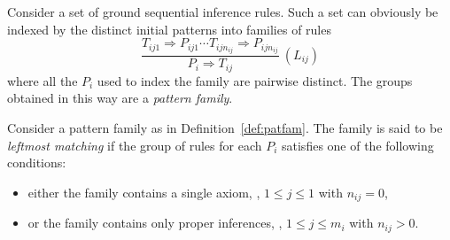 \documentclass[letterpaper,11pt]{article}
\begin{document}
\begin{definition}\label{def:patfam}
  Consider a set of ground sequential inference rules.  Such a set can obviously be indexed by the
  distinct initial patterns into families of rules
  \begin{displaymath}
    \dfrac{ T_{ij1} ⇒ P_{ij1} \cdots T_{ijn_{ij}} ⇒ P_{ijn_{ij}} }{ P_i ⇒ T_{ij} } ~(L_{ij})
  \end{displaymath}
  where all the $P_i$ used to index the family are pairwise distinct.  The groups obtained in this
  way are a \emph{pattern family}.
\end{definition}

\begin{definition}
  Consider a pattern family as in Definition~\ref{def:patfam}.  The family is said to be
  \emph{leftmost matching} if the group of rules for each $P_i$ satisfies one of the following
  conditions:
  \begin{itemize}
  \item either the family contains a single axiom, \ie, $1≤j≤1$ with $n_{ij}=0$,
  \item or the family contains only proper inferences, \ie, $1≤j≤m_i$ with $n_{ij}>0$.
  \end{itemize}
\end{definition}

\end{document}
